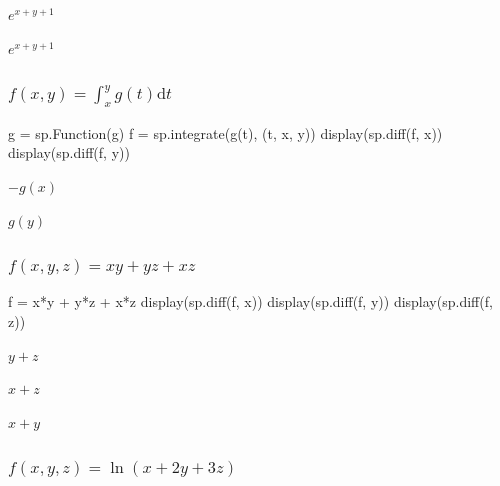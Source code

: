 \documentclass[
  letterpaper,
  DIV=11,
  numbers=noendperiod]{scrartcl}
\newenvironment{Shaded}{\begin{snugshade}}{\end{snugshade}}
\newcommand{\NormalTok}[1]{\textcolor[rgb]{0.00,0.23,0.31}{#1}}
\newcommand{\OperatorTok}[1]{\textcolor[rgb]{0.37,0.37,0.37}{#1}}
\newcommand{\StringTok}[1]{\textcolor[rgb]{0.13,0.47,0.30}{#1}}
\begin{document}
$\displaystyle e^{x + y + 1}$

$\displaystyle e^{x + y + 1}$

\hypertarget{fx-y-int_xy-gt-mathrmdt}{%
\subsubsection{\texorpdfstring{\(f(x, y) = \int_x^y g(t) \mathrm{d}t\)}{f(x, y) = \textbackslash int\_x\^{}y g(t) \textbackslash mathrm\{d\}t}}\label{fx-y-int_xy-gt-mathrmdt}}

\begin{Shaded}
\begin{Highlighting}[numbers=left,,]
\NormalTok{g }\OperatorTok{=}\NormalTok{ sp.Function(}\StringTok{\textquotesingle{}g\textquotesingle{}}\NormalTok{)}
\NormalTok{f }\OperatorTok{=}\NormalTok{ sp.integrate(g(t), (t, x, y))}
\NormalTok{display(sp.diff(f, x))}
\NormalTok{display(sp.diff(f, y))}
\end{Highlighting}
\end{Shaded}

$\displaystyle - g{\left(x \right)}$

$\displaystyle g{\left(y \right)}$

\hypertarget{fx-y-z-xyyzxz}{%
\subsubsection{\texorpdfstring{\(f(x, y, z) = xy+yz+xz\)}{f(x, y, z) = xy+yz+xz}}\label{fx-y-z-xyyzxz}}

\begin{Shaded}
\begin{Highlighting}[numbers=left,,]
\NormalTok{f }\OperatorTok{=}\NormalTok{ x}\OperatorTok{*}\NormalTok{y }\OperatorTok{+}\NormalTok{ y}\OperatorTok{*}\NormalTok{z }\OperatorTok{+}\NormalTok{ x}\OperatorTok{*}\NormalTok{z}
\NormalTok{display(sp.diff(f, x))}
\NormalTok{display(sp.diff(f, y))}
\NormalTok{display(sp.diff(f, z))}
\end{Highlighting}
\end{Shaded}

$\displaystyle y + z$

$\displaystyle x + z$

$\displaystyle x + y$

\hypertarget{fx-y-z-lnx-2y-3z}{%
\subsubsection{\texorpdfstring{\(f(x, y, z) = \ln(x + 2y + 3z)\)}{f(x, y, z) = \textbackslash ln(x + 2y + 3z)}}\label{fx-y-z-lnx-2y-3z}}
\end{document}
